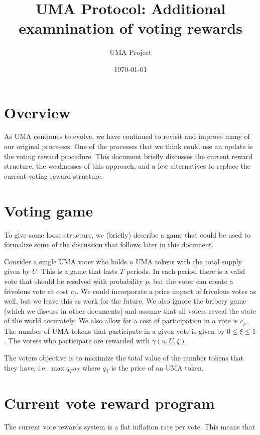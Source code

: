 \item \documentclass[12pt]{article}
\title{UMA Protocol: Additional examnination of voting rewards}
\author{UMA Project}
\date{\today}
\begin{document}
\maketitle
\clearpage
\newpage


\section{Overview}

  As UMA continues to evolve, we have continued to revisit and improve many of our original processes. One of the
  processes that we think could use an update is the voting reward procedure. This document briefly discusses the
  current reward structure, the weaknesses of this approach, and a few alternatives to replace the current voting
  reward structure.


\section{Voting game}

  To give some loose structure, we (briefly) describe a game that could be used to formalize some of the discussion
  that follows later in this document.

  Consider a single UMA voter who holds $u$ UMA tokens with the total supply given by $U$. This is a game that lasts $T$
  periods. In each period there is a valid vote that should be resolved with probability $p$, but the voter can create
  a frivolous vote at cost $c_{f}$. We could incorporate a price impact of frivolous votes as well, but we leave this
  as work for the future. We also ignore the bribery game (which we discuss in other documents) and assume that
  all voters reveal the state of the world accurately. We also allow for a cost of participation in a vote is $c_{p}$.
  The number of UMA tokens that participate in a given vote is given by $0 \leq \xi \leq 1$. The voters who
  participate are rewarded with $\gamma(u, U, \xi)$.

  The voters objective is to maximize the total value of the number tokens that they have, i.e. $\max q_{T} u_{T}$ where
  $q_{T}$ is the price of an UMA token.


\section{Current vote reward program}

  The current vote rewards system is a flat inflation rate per vote. This means that
\end{document}
